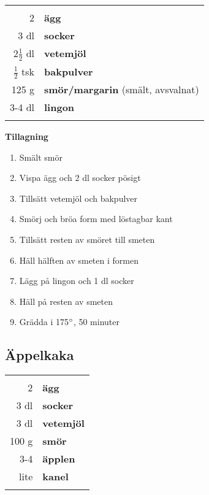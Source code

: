 \begin{table}[H]
	\begin{tabular}{rl}
	\hline
	&\\
		2 & \textbf{ägg}\\
		3 dl & \textbf{socker}\\
		2$\frac{1}{2}$ dl & \textbf{vetemjöl}\\
		$\frac{1}{2}$ tsk & \textbf{bakpulver}\\
		125 g & \textbf{smör/margarin} (smält, avsvalnat)\\
		3-4 dl & \textbf{lingon}\\
	&\\
	\hline
	\end{tabular}
\end{table}


\begin{multicols*}{2}

\noindent \textbf{Tillagning}
\begin{enumerate}
	\itemsep0cm
	\item Smält smör
	\item Vispa ägg och 2 dl socker pösigt
	\item Tillsätt vetemjöl och bakpulver
	\item Smörj och bröa form med löstagbar kant
	\item Tillsätt resten av smöret till smeten
	\item Häll hälften av smeten i formen
	\item Lägg på lingon och 1 dl socker
	\item Häll på resten av smeten
	\item Grädda i 175$\degree$, 50 minuter
\end{enumerate}

\end{multicols*}

\clearpage

\subsection{Äppelkaka}

\begin{table}[H]
	\begin{tabular}{rl}
	\hline
	&\\
		2 & \textbf{ägg}\\
		3 dl & \textbf{socker}\\
		3 dl & \textbf{vetemjöl}\\
		100 g & \textbf{smör}\\
		3-4 & \textbf{äpplen}\\
		lite & \textbf{kanel}\\
	&\\
	\hline
	\end{tabular}
\end{table}

